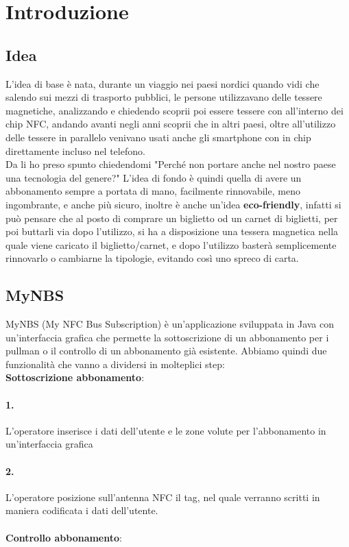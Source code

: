 \section{Introduzione}

\subsection{Idea}

\hspace{\parindent}L'idea di base è nata, durante un viaggio nei paesi nordici quando vidi che salendo sui mezzi di trasporto pubblici, le persone utilizzavano delle tessere magnetiche, analizzando e chiedendo scoprii poi essere tessere con all'interno dei chip NFC, andando avanti negli anni scoprii che in altri paesi, oltre all'utilizzo delle tessere in parallelo venivano usati anche gli smartphone con in chip direttamente incluso nel telefono.
\\Da li ho preso spunto chiedendomi "Perché non portare anche nel nostro paese una tecnologia del genere?" L'idea di fondo è quindi quella di avere un abbonamento sempre a portata di mano, facilmente rinnovabile, meno ingombrante, e anche più sicuro, inoltre è anche un'idea \textbf{eco-friendly}, infatti si può pensare che al posto di comprare un biglietto od un carnet di biglietti, per poi buttarli via dopo l'utilizzo, si ha a disposizione una tessera magnetica nella quale viene caricato il biglietto/carnet, e dopo l'utilizzo basterà semplicemente rinnovarlo o cambiarne la tipologie, evitando così uno spreco di carta.

\subsection{MyNBS}

\hspace{\parindent}MyNBS (My NFC Bus Subscription) è un'applicazione sviluppata in Java con un'interfaccia grafica che permette la sottoscrizione di un abbonamento per i pullman o il controllo di un abbonamento già esistente. Abbiamo quindi due funzionalità che vanno a dividersi in molteplici step: 
\\ \textbf{Sottoscrizione abbonamento}:
\paragraph{1.} L'operatore inserisce i dati dell'utente e le zone volute per l'abbonamento in un'interfaccia grafica
\paragraph{2.} L'operatore posizione sull'antenna NFC il tag, nel quale verranno scritti in maniera codificata i dati dell'utente.
\bigskip
\\\\\textbf{Controllo abbonamento}:
